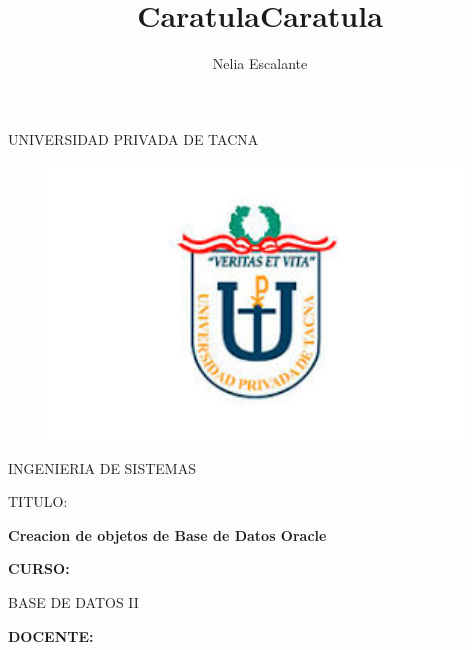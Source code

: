 \documentclass[12pt,letterpaper]{article}
\author{Nelia Escalante}
\title{Caratula}
\begin{document}
\title{Caratula}

\begin{titlepage}
\begin{center}
\large{UNIVERSIDAD PRIVADA DE TACNA}\\
\vspace*{-0.025in}
\begin{figure}[htb]
\begin{center}
\includegraphics[width=11cm]{./IMG/logo}
\end{center}
\end{figure}
\Large INGENIERIA DE SISTEMAS  \\

\vspace*{0.5in}
\begin{large}
TITULO:\\
\end{large}

\vspace*{0.1in}
\begin{Large}
\textbf{Creacion de objetos de Base de Datos Oracle} \\
\end{Large}

\vspace*{0.3in}
\begin{Large}
\textbf{CURSO:} \\
\end{Large}

\vspace*{0.1in}
\begin{large}
BASE DE DATOS II\\
\end{large}

\vspace*{0.3in}
\begin{Large}
\textbf{DOCENTE:} \\
\end{Large}


\end{center}
\end{titlepage}
\end{document}
